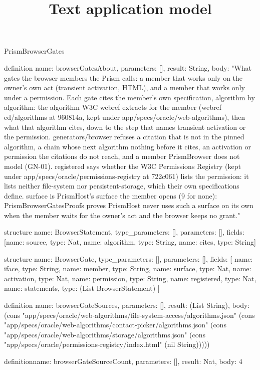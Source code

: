 \begin{lexlean}{PrismBrowserGates}
\title{Text application model}
\begin{semanticmodule}
definition{
  name: browserGatesAbout,
  parameters: [],
  result: String,
  body: "What gates the browser members the Prism calls: a member that works only on the owner's own act (transient activation, HTML), and a member that works only under a permission. Each gate cites the member's own specification, algorithm by algorithm: the algorithm W3C webref extracts for the member (webref ed/algorithms at 960814a, kept under app/specs/oracle/web-algorithms), then what that algorithm cites, down to the step that names transient activation or the permission. generators/browser refuses a citation that is not in the pinned algorithm, a chain whose next algorithm nothing before it cites, an activation or permission the citations do not reach, and a member PrismBrowser does not model (GN-01). registered says whether the W3C Permissions Registry (kept under app/specs/oracle/permissions-registry at 722c061) lists the permission: it lists neither file-system nor persistent-storage, which their own specifications define. surface is PrismHost's surface the member opens (9 for none): PrismBrowserGatesProofs proves PrismHost never uses such a surface on its own when the member waits for the owner's act and the browser keeps no grant."
}

structure{
  name: BrowserStatement,
  type_parameters: [],
  parameters: [],
  fields: [{name: source, type: Nat}, {name: algorithm, type: String}, {name: cites, type: String}]
}

structure{
  name: BrowserGate,
  type_parameters: [],
  parameters: [],
  fields: [
    {name: iface, type: String},
    {name: member, type: String},
    {name: surface, type: Nat},
    {name: activation, type: Nat},
    {name: permission, type: String},
    {name: registered, type: Nat},
    {name: statements, type: (List BrowserStatement)}
  ]
}

definition{
  name: browserGateSources,
  parameters: [],
  result: (List String),
  body: (cons "app/specs/oracle/web-algorithms/file-system-access/algorithms.json" (cons "app/specs/oracle/web-algorithms/contact-picker/algorithms.json" (cons "app/specs/oracle/web-algorithms/storage/algorithms.json" (cons "app/specs/oracle/permissions-registry/index.html" (nil String)))))
}

definition{name: browserGateSourceCount, parameters: [], result: Nat, body: 4}


\end{semanticmodule}
\end{lexlean}
